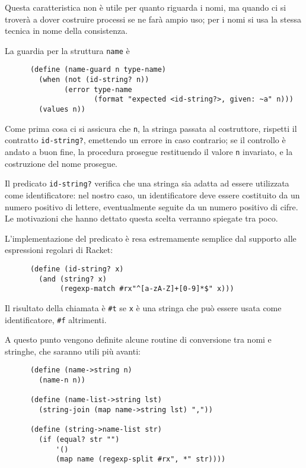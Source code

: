 Questa caratteristica non \`e utile per quanto riguarda i nomi, ma
quando ci si trover\`a a dover costruire processi se ne far\`a ampio
uso; per i nomi si usa la stessa tecnica in nome della consistenza.

La guardia per la struttura \lstinline{name} \`e

\begin{lstlisting}
      (define (name-guard n type-name)
        (when (not (id-string? n))
              (error type-name
                     (format "expected <id-string?>, given: ~a" n)))
        (values n))
\end{lstlisting}

Come prima cosa ci si assicura che \lstinline{n}, la stringa passata al
costruttore, rispetti il contratto \lstinline{id-string?}, emettendo un
errore in caso contrario; se il controllo \`e andato a buon fine, la
procedura prosegue restituendo il valore \lstinline{n} invariato, e la
costruzione del nome prosegue.

Il predicato \lstinline{id-string?} verifica che una stringa sia adatta
ad essere utilizzata come identificatore: nel nostro caso, un
identificatore deve essere costituito da un numero positivo di lettere,
eventualmente seguite da un numero positivo di cifre. Le motivazioni che
hanno dettato questa scelta verranno spiegate tra poco.

L'implementazione del predicato \`e resa estremamente semplice dal supporto
alle espressioni regolari di Racket:

\begin{lstlisting}
      (define (id-string? x)
        (and (string? x)
             (regexp-match #rx"^[a-zA-Z]+[0-9]*$" x)))
\end{lstlisting}

Il risultato della chiamata \`e \lstinline{#t} se \lstinline{x} \`e una
stringa che pu\`o essere usata come identificatore, \lstinline{#f}
altrimenti.

A questo punto vengono definite alcune routine di conversione tra nomi e
stringhe, che saranno utili pi\`u avanti:

\begin{lstlisting}
      (define (name->string n)
        (name-n n))

      (define (name-list->string lst)
        (string-join (map name->string lst) ","))

      (define (string->name-list str)
        (if (equal? str "")
            '()
            (map name (regexp-split #rx", *" str))))
\end{lstlisting}

